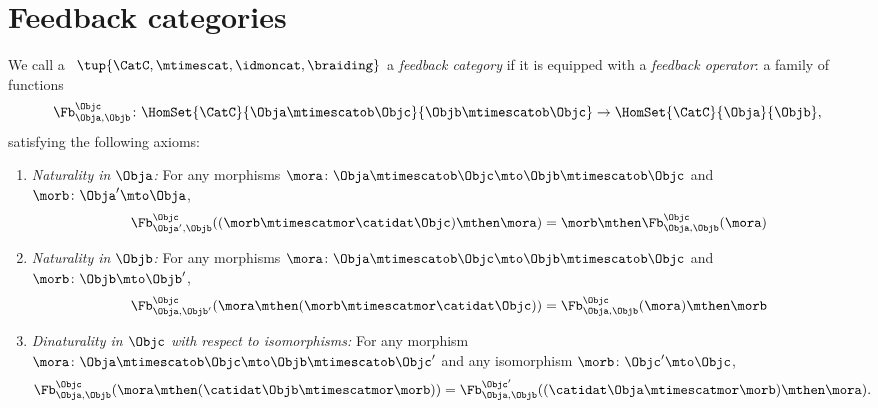 
\section{Feedback categories}
\label{sec:feedback-categories}



\begin{ctdefinition}
    \label{def:feedback-cat}
    We call a ~$\tup{\CatC, \mtimescat, \idmoncat, \braiding}$ a \emph{feedback category} if it is equipped with a \emph{feedback operator}: a family of functions
    \begin{equation}
        \Fb_{\Obja,\Objb}^\Objc\colon \HomSet{\CatC}{\Obja \mtimescatob \Objc}{\Objb\mtimescatob \Objc}\to \HomSet{\CatC}{\Obja}{\Objb},
    \end{equation}
    satisfying the following axioms:
    \begin{enumerate}
        \item \emph{Naturality in $\Obja$:} For any morphisms $\mora\colon \Obja\mtimescatob \Objc \mto \Objb\mtimescatob \Objc$ and $\morb \colon \Obja' \mto \Obja$,
              \begin{equation}\label{eq:feedback-naturality-1}
                  \Fb_{\Obja', \Objb}^\Objc ( (\morb \mtimescatmor \catidat\Objc) \mthen \mora) = \morb \mthen \Fb_{\Obja, \Objb}^\Objc (\mora)
              \end{equation}
        \item \emph{Naturality in $\Objb$:} For any morphisms $\mora\colon \Obja\mtimescatob \Objc \mto \Objb\mtimescatob \Objc$ and $\morb \colon \Objb \mto \Objb'$,
              \begin{equation}\label{eq:feedback-naturality-2}
                  \Fb_{\Obja, \Objb'}^\Objc ( \mora \mthen (\morb \mtimescatmor \catidat\Objc) ) = \Fb_{\Obja, \Objb}^\Objc (\mora) \mthen \morb
              \end{equation}
        \item \emph{Dinaturality in $\Objc$ with respect to isomorphisms:}
              For any morphism $\mora \colon \Obja  \mtimescatob \Objc \mto \Objb \mtimescatob \Objc'$ and any isomorphism $\morb \colon \Objc' \mto \Objc$,
              \begin{equation}\label{eq:feedback-dinaturality}
                  \Fb_{\Obja, \Objb}^{\Objc} (\mora \mthen (\catidat\Objb \mtimescatmor \morb)) = \Fb_{\Obja, \Objb}^{\Objc'}((\catidat\Obja \mtimescatmor \morb) \mthen \mora).
              \end{equation}


\end{enumerate}
\end{ctdefinition}
